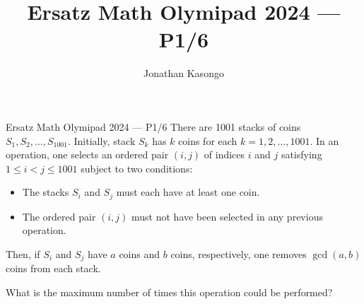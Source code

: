 \documentclass{article}
\author{Jonathan Kasongo}
\title{Ersatz Math Olymipad 2024 --- P1/6}
\begin{document}
\maketitle

\begin{problem}{Ersatz Math Olymipad 2024 --- P1/6}
There are 1001 stacks of coins $S_1, S_2, \ldots, S_{1001}$.
Initially, stack $S_k$ has $k$ coins for each $k=1,2, \ldots, 1001$.
In an operation, one selects an ordered pair $(i, j)$ of indices
$i$ and $j$ satisfying $1 \leq i<j \leq 1001$ subject to two conditions:

\begin{itemize}
\item The stacks $S_i$ and $S_j$ must each have at least one coin.
\item The ordered pair $(i, j)$ must not have been selected in any
previous operation.
\end{itemize}

Then, if $S_i$ and $S_j$ have $a$ coins and $b$ coins, respectively,
one removes $\gcd(a, b)$ coins from each stack. \vspace{.2cm}

What is the maximum number of times this operation could be performed?
\end{problem}
\end{document}
